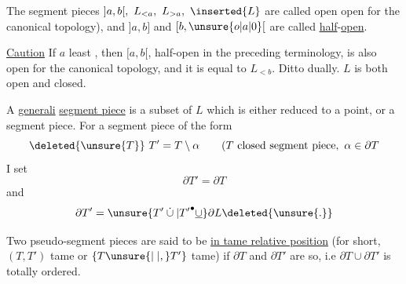 The segment pieces $]a,b[,\ L_{<a},\ L_{>a},\ \inserted{L}$ are called open    open for the canonical topology),  and $]a,b]$ and $[b,\unsure{o|a|0}[$ are called \uline{half}-\uline{open}.

\uline{Caution}  If $a$ least , then $[a,b[$,   half-open in the preceding terminology, is also open for the canonical topology, and it is equal to $L_{<b}$. Ditto dually. $L$ is both open and closed.

A \uline{generali} \uline{segment piece}  is a subset of $L$ which is either reduced to a point, or a segment piece. For a segment piece of the form
\[
\deleted{\unsure{T}}\ T'=T\setminus\alpha\qquad(T\text{ closed segment piece},\ \alpha\in\partial T
\]
I set
\[
\partial T'=\partial T
\]
and  
\[
\partial T'=\unsure{T'\mathbin{\dot\cup}|{T'}^\bullet\mathbin{\underline{\cup}}}\partial L\deleted{\unsure{.}}
\]

 Two pseudo-segment pieces  are said to be \uline{in tame relative position} (for short, $(T,T')$  tame or $\{T\unsure{\mid|,}T'\}$ tame) if $\partial T$ and $\partial T'$ are so, i.e $\partial T\cup\partial T'$ is totally ordered.
